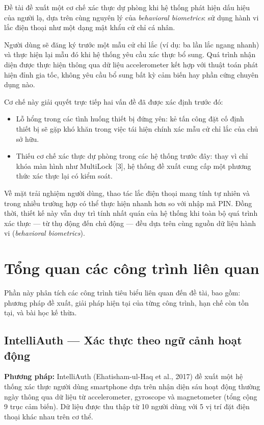 \documentclass[../DoAn.tex]{subfiles}
\begin{document}
    Đề tài đề xuất một cơ chế xác thực dự phòng khi hệ thống phát hiện dấu hiệu của người lạ, dựa trên cùng nguyên lý của \textit{behavioral biometrics}: sử dụng hành vi lắc điện thoại như một dạng mật khẩu cử chỉ cá nhân.
    
    Người dùng sẽ đăng ký trước một mẫu cử chỉ lắc (ví dụ: ba lần lắc ngang nhanh) và thực hiện lại mẫu đó khi hệ thống yêu cầu xác thực bổ sung. Quá trình nhận diện được thực hiện thông qua dữ liệu accelerometer kết hợp với thuật toán phát hiện đỉnh gia tốc, không yêu cầu bổ sung bất kỳ cảm biến hay phần cứng chuyên dụng nào.
    
    Cơ chế này giải quyết trực tiếp hai vấn đề đã được xác định trước đó:
    \begin{itemize}
        \item Lỗ hổng trong các tình huống thiết bị đứng yên: kẻ tấn công đặt cố định thiết bị sẽ gặp khó khăn trong việc tái hiện chính xác mẫu cử chỉ lắc của chủ sở hữu.
        
        \item Thiếu cơ chế xác thực dự phòng trong các hệ thống trước đây: thay vì chỉ khóa màn hình như MultiLock~[3], hệ thống đề xuất cung cấp một phương thức xác thực lại có kiểm soát.
    \end{itemize}
    
    Về mặt trải nghiệm người dùng, thao tác lắc điện thoại mang tính tự nhiên và trong nhiều trường hợp có thể thực hiện nhanh hơn so với nhập mã PIN. Đồng thời, thiết kế này vẫn duy trì tính nhất quán của hệ thống khi toàn bộ quá trình xác thực --- từ thụ động đến chủ động --- đều dựa trên cùng nguồn dữ liệu hành vi (\textit{behavioral biometrics}).

    \section{Tổng quan các công trình liên quan}

    Phần này phân tích các công trình tiêu biểu liên quan đến đề tài, bao gồm: phương pháp đề xuất, giải pháp hiện tại của từng công trình, hạn chế còn tồn tại, và bài học kế thừa.

    \subsection{IntelliAuth --- Xác thực theo ngữ cảnh hoạt động}

    \textbf{Phương pháp:} IntelliAuth (Ehatisham-ul-Haq et al., 2017) đề xuất một hệ thống xác thực người dùng smartphone dựa trên nhận diện sáu hoạt động thường ngày thông qua dữ liệu từ accelerometer, gyroscope và magnetometer (tổng cộng 9 trục cảm biến). Dữ liệu được thu thập từ 10 người dùng với 5 vị trí đặt điện thoại khác nhau trên cơ thể.
    
\end{document}
